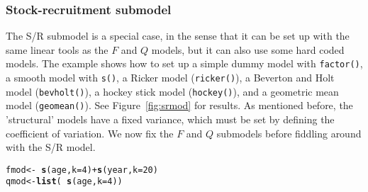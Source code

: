 \documentclass[a4paper,english,10pt]{article}\usepackage[]{graphicx}\usepackage[]{color}
\makeatletter
\newcommand{\hlnum}[1]{\textcolor[rgb]{0.686,0.059,0.569}{#1}}%
\newcommand{\hlopt}[1]{\textcolor[rgb]{0,0,0}{#1}}%
\newcommand{\hlstd}[1]{\textcolor[rgb]{0.345,0.345,0.345}{#1}}%
\newcommand{\hlkwb}[1]{\textcolor[rgb]{0.69,0.353,0.396}{#1}}%
\newcommand{\hlkwc}[1]{\textcolor[rgb]{0.333,0.667,0.333}{#1}}%
\newcommand{\hlkwd}[1]{\textcolor[rgb]{0.737,0.353,0.396}{\textbf{#1}}}%
\newenvironment{kframe}{%
 \def\at@end@of@kframe{}%
 \ifinner\ifhmode%
  \def\at@end@of@kframe{\end{minipage}}%
  \begin{minipage}{\columnwidth}%
 \fi\fi%
 \def\FrameCommand##1{\hskip\@totalleftmargin \hskip-\fboxsep
 \colorbox{shadecolor}{##1}\hskip-\fboxsep
     \hskip-\linewidth \hskip-\@totalleftmargin \hskip\columnwidth}%
 \MakeFramed {\advance\hsize-\width
   \@totalleftmargin\z@ \linewidth\hsize
   \@setminipage}}%
 {\par\unskip\endMakeFramed%
 \at@end@of@kframe}
\newenvironment{knitrout}{}{} %
\newcommand{\code}[1]{{\texttt{#1}}}
\makeatother
\begin{document}
\subsubsection{Stock-recruitment submodel}

The S/R submodel is a special case, in the sense that it can be set up with the same linear tools as the $F$ and $Q$ models, but it can also use some hard coded models. The example shows how to set up a simple dummy model with \code{factor()}, a smooth model with \code{s()}, a Ricker model (\code{ricker()}), a Beverton and Holt model (\code{bevholt()}), a hockey stick model (\code{hockey()}), and a geometric mean model (\code{geomean()}). See Figure~\ref{fig:srmod} for results. As mentioned before, the 'structural' models have a fixed variance, which must be set by defining the coefficient of variation. We now fix the $F$ and $Q$ submodels before fiddling around with the S/R model.

\begin{knitrout}
\color{fgcolor}\begin{kframe}
\begin{alltt}
\hlstd{fmod} \hlkwb{<-} \hlopt{~} \hlkwd{s}\hlstd{(age,} \hlkwc{k}\hlstd{=}\hlnum{4}\hlstd{)} \hlopt{+} \hlkwd{s}\hlstd{(year,} \hlkwc{k} \hlstd{=} \hlnum{20}\hlstd{)}
\hlstd{qmod} \hlkwb{<-} \hlkwd{list}\hlstd{(}\hlopt{~} \hlkwd{s}\hlstd{(age,} \hlkwc{k}\hlstd{=}\hlnum{4}\hlstd{))}
\end{alltt}
\end{kframe}
\end{knitrout}
\end{document}
